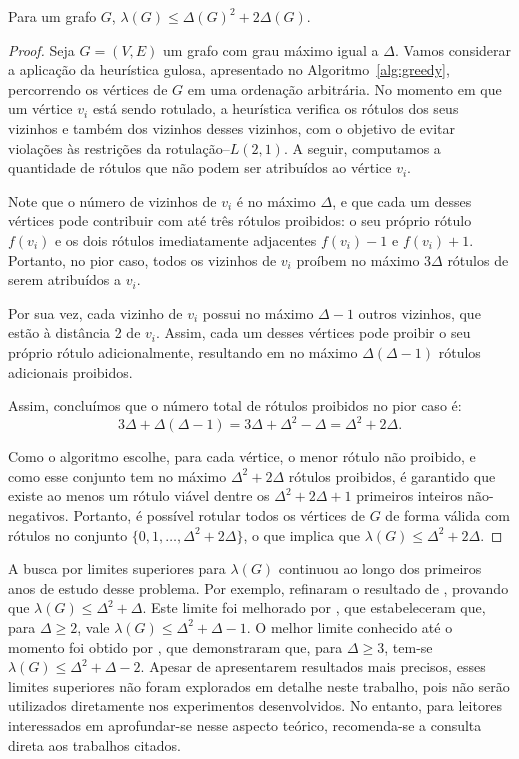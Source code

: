 \begin{teo}
\label{teo:limite-superior-griggs}
Para um grafo $G$, $\lambda(G) \leq \Delta(G)^2 + 2\Delta(G)$.
\end{teo}

\begin{proof}
Seja \( G = (V, E) \) um grafo com grau máximo igual a \( \Delta \). Vamos considerar a aplicação da heurística gulosa, apresentado no Algoritmo~\ref{alg:greedy}, percorrendo os vértices de \( G \) em uma ordenação arbitrária. No momento em que um vértice \( v_i \) está sendo rotulado, a heurística verifica os rótulos dos seus vizinhos e também dos vizinhos desses vizinhos, com o objetivo de evitar violações às restrições da rotulação–\(L(2,1)\). A seguir, computamos a quantidade de rótulos que não podem ser atribuídos ao vértice $v_i$.

Note que o número de vizinhos de \( v_i \) é no máximo \( \Delta \), e que cada um desses vértices pode contribuir com até três rótulos proibidos: o seu próprio rótulo $f(v_i)$ e os dois rótulos  imediatamente adjacentes $f(v_i)-1$ e $f(v_i)+1$. Portanto, no pior caso, todos os vizinhos de \( v_i \) proíbem no máximo \( 3\Delta \) rótulos de serem atribuídos a $v_i$.

Por sua vez, cada vizinho de $v_i$ possui no máximo $\Delta-1$ outros vizinhos, que estão à distância 2 de $v_i$. Assim, cada um desses vértices pode proibir o seu próprio rótulo adicionalmente, resultando em no máximo \( \Delta(\Delta - 1) \) rótulos adicionais proibidos.

Assim, concluímos que o número total de rótulos proibidos no pior caso é:
\[
3\Delta + \Delta(\Delta - 1) = 3\Delta + \Delta^2 - \Delta = \Delta^2 + 2\Delta.
\]

Como o algoritmo escolhe, para cada vértice, o menor rótulo não proibido, e como esse conjunto tem no máximo \( \Delta^2 + 2\Delta \) rótulos proibidos, é garantido que existe ao menos um rótulo viável dentre os \( \Delta^2 + 2\Delta + 1 \) primeiros inteiros não-negativos. Portanto, é possível rotular todos os vértices de \( G \) de forma válida com rótulos no conjunto \( \{0, 1, \dots, \Delta^2 + 2\Delta\} \), o que implica que \( \lambda(G) \leq \Delta^2 + 2\Delta. \)
\end{proof}

A busca por limites superiores para $\lambda(G)$ continuou ao longo dos primeiros anos de estudo desse problema. Por exemplo,  refinaram o resultado de , provando que \(\lambda(G) \leq \Delta^2 + \Delta\). Este limite foi melhorado por , que estabeleceram que, para \(\Delta \geq 2\), vale \(\lambda(G) \leq \Delta^2 + \Delta - 1\). O melhor limite conhecido até o momento foi obtido por , que demonstraram que, para \(\Delta \geq 3\), tem-se \(\lambda(G) \leq \Delta^2 + \Delta - 2\). Apesar de apresentarem resultados mais precisos, esses limites superiores não foram explorados em detalhe neste trabalho, pois não serão utilizados diretamente nos experimentos desenvolvidos. No entanto, para leitores interessados em aprofundar-se nesse aspecto teórico, recomenda-se a consulta direta aos trabalhos citados.

